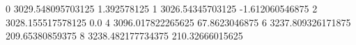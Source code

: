 0 3029.548095703125 1.392578125
1 3026.54345703125 -1.612060546875
2 3028.155517578125 0.0
4 3096.017822265625 67.8623046875
6 3237.809326171875 209.65380859375
8 3238.482177734375 210.32666015625
